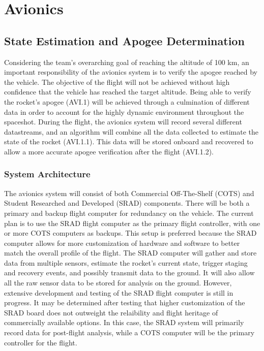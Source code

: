 \section{Avionics} \label{section:avionics}
\subsection{State Estimation and Apogee Determination}  %

Considering the team’s overarching goal of reaching the altitude of 100 km, an important responsibility of the avionics system is to verify the apogee reached by the vehicle. The objective of the flight will not be achieved without high confidence that the vehicle has reached the target altitude. Being able to verify the rocket’s apogee (AVI.1) will be achieved through a culmination of different data in order to account for the highly dynamic environment throughout the spaceshot. During the flight, the avionics system will record several different datastreams, and an algorithm will combine all the data collected to estimate the state of the rocket (AVI.1.1). This data will be stored onboard and recovered to allow a more accurate apogee verification after the flight (AVI.1.2).


\subsubsection{System Architecture}
The avionics system will consist of both Commercial Off-The-Shelf (COTS) and Student Researched and Developed (SRAD) components. There will be both a primary and backup flight computer for redundancy on the vehicle. The current plan is to use the SRAD flight computer as the primary flight controller, with one or more COTS computers as backups. This setup is preferred because the SRAD computer allows for more customization of hardware and software to better match the overall profile of the flight. The SRAD computer will gather and store data from multiple sensors, estimate the rocket’s current state, trigger staging and recovery events, and possibly transmit data to the ground. It will also allow all the raw sensor data to be stored for analysis on the ground. However, extensive development and testing of the SRAD flight computer is still in progress. It may be determined after testing that higher customization of the SRAD board does not outweight the relaibility and flight heritage of commercially available options. In this case, the SRAD system will primarily record data for post-flight analysis, while a COTS computer will be the primary controller for the flight.

